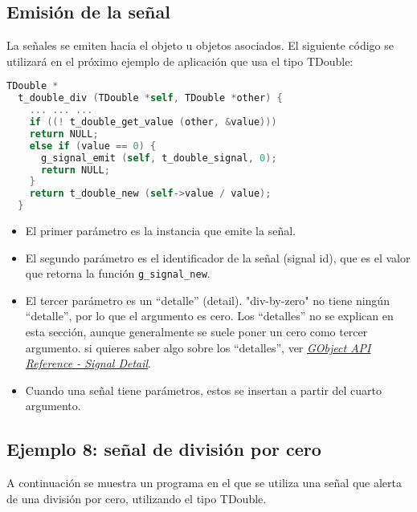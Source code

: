\subsection{Emisión de la señal}
La señales se emiten hacia el objeto u objetos asociados. El siguiente código se utilizará en
el próximo ejemplo de aplicación que usa el tipo \textsf{TDouble}:
\begin{lstlisting}[language=C, numbers=none]
  TDouble *
  t_double_div (TDouble *self, TDouble *other) {
    ... ... ...
    if ((! t_double_get_value (other, &value)))
    return NULL;
    else if (value == 0) {
      g_signal_emit (self, t_double_signal, 0);
      return NULL;
    }
    return t_double_new (self->value / value);
  }
\end{lstlisting}

\begin{itemize}
  \tightlist
\item El primer parámetro es la instancia que emite la señal.
\item El segundo parámetro es el identificador de la señal (\textsf{signal id}), que es el valor
  que retorna la función \texttt{g\_signal\_new}.
\item El tercer parámetro es un ``detalle'' (\textsf{detail}). \textsf{"div-by-zero"} no tiene
  ningún ``detalle'', por lo que el argumento es cero. Los ``detalles'' no se explican en esta
  sección, aunque generalmente se suele poner un cero como tercer argumento. si quieres saber algo sobre los ``detalles'', ver
  \href{https://docs.gtk.org/gobject/concepts.html#the-detail-argument}
  {\emph{\textsf{GObject API Reference - Signal Detail}}}.
\item Cuando una señal tiene parámetros, estos se insertan a partir del cuarto argumento.
\end{itemize}

\subsection{Ejemplo 8: señal de división por cero}
A continuación se muestra un programa en el que se utiliza una señal que alerta de una división por cero,
utilizando el tipo \textsf{TDouble}.

